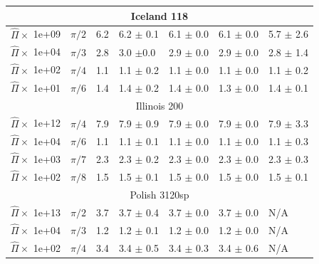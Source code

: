 \begin{table}[t]
\begin{tabular}{|l|l|l|l|l|l|l|}
          \hline
          \multicolumn{7}{c}{Iceland 118}\\
          \hline
$\hat\Pi \times$ 1e+09 & $\pi/2$\hspace{-4mm}&6.2\!\! & 6.2 $\pm$ 0.1 & 6.1 $\pm$ 0.0 & 6.1 $\pm$ 0.0 & 5.7 $\pm$ 2.6\\
$\hat\Pi \times$ 1e+04 & $\pi/3$\hspace{-4mm}&2.8\!\! & 3.0 $\pm$0.0 & 2.9 $\pm$ 0.0 & 2.9 $\pm$ 0.0 & 2.8 $\pm$ 1.4\\
$\hat\Pi \times$ 1e+02 & $\pi/4$\hspace{-4mm}&1.1\!\! & 1.1 $\pm$ 0.2 & 1.1 $\pm$ 0.0 & 1.1 $\pm$ 0.0 & 1.1 $\pm$ 0.2\\
$\hat\Pi \times$ 1e+01 & $\pi/6$\hspace{-4mm}&1.4\!\! & 1.4 $\pm$ 0.2 & 1.4 $\pm$ 0.0 & 1.3 $\pm$ 0.0 & 1.4 $\pm$ 0.1\\
\hline 
          \multicolumn{7}{c}{Illinois 200}\\
\hline
$\hat\Pi\times$ 1e+12 & $\pi/4$\hspace{-4mm}&7.9\!\! & 7.9 $\pm$ 0.9 & 7.9 $\pm$ 0.0 & 7.9 $\pm$ 0.0 & 7.9 $\pm$ 3.3\\
$\hat\Pi\times$ 1e+04 & $\pi/6$\hspace{-4mm}&1.1\!\! & 1.1 $\pm$ 0.1 & 1.1 $\pm$ 0.0 & 1.1 $\pm$ 0.0 & 1.1 $\pm$ 0.3\\
$\hat\Pi\times$ 1e+03 & $\pi/7$\hspace{-4mm}&2.3\!\! & 2.3 $\pm$ 0.2 & 2.3 $\pm$ 0.0 & 2.3 $\pm$ 0.0 & 2.3 $\pm$ 0.3\\
$\hat\Pi\times$ 1e+02 & $\pi/8$\hspace{-4mm}&1.5\!\! & 1.5 $\pm$ 0.1 & 1.5 $\pm$ 0.0 & 1.5 $\pm$ 0.0 & 1.5 $\pm$ 0.1\\
\hline
\multicolumn{7}{c}{Polish 3120sp}\\
\hline
$\hat\Pi\times$ 1e+13 & $\pi/2$\hspace{-4mm}&3.7\!\! & 3.7 $\pm$ 0.4 & 3.7 $\pm$ 0.0 & 3.7 $\pm$ 0.0 & N/A\\
$\hat\Pi\times$ 1e+04 & $\pi/3$\hspace{-4mm}&1.2\!\! & 1.2 $\pm$ 0.1 & 1.2 $\pm$ 0.0 & 1.2 $\pm$ 0.0 & N/A\\
$\hat\Pi\times$ 1e+02 & $\pi/4$\hspace{-4mm}&3.4\!\! & 3.4 $\pm$ 0.5 & 3.4 $\pm$ 0.3 & 3.4 $\pm$ 0.6 & N/A\\
\bottomrule
    \end{tabular}
\end{table}




